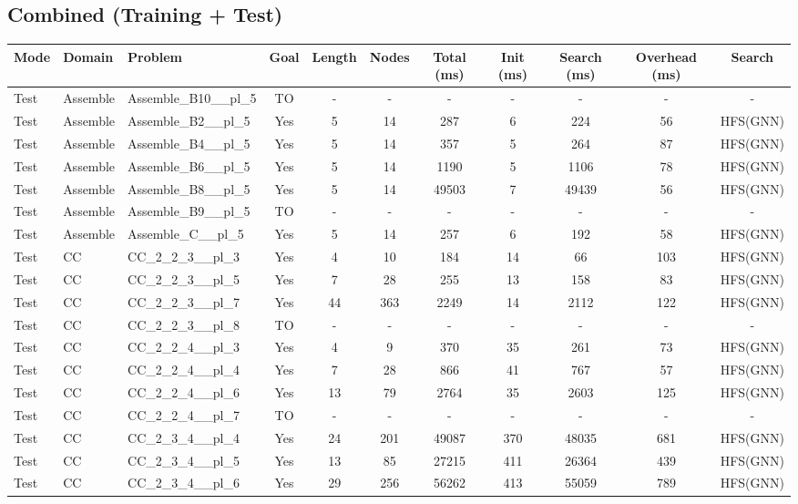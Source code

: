 \documentclass{article}
\begin{document}
\subsection*{Combined (Training + Test)}
\begin{tabular}{lllcccccccc}
\toprule
Mode & Domain & Problem & Goal & Length & Nodes & Total (ms) & Init (ms) & Search (ms) & Overhead (ms) & Search \\
\midrule
Test & Assemble & Assemble\_B10\_\_pl\_5 & TO & - & - & - & - & - & - & - \\
Test & Assemble & Assemble\_B2\_\_pl\_5 & Yes & 5 & 14 & 287 & 6 & 224 & 56 & HFS(GNN) \\
Test & Assemble & Assemble\_B4\_\_pl\_5 & Yes & 5 & 14 & 357 & 5 & 264 & 87 & HFS(GNN) \\
Test & Assemble & Assemble\_B6\_\_pl\_5 & Yes & 5 & 14 & 1190 & 5 & 1106 & 78 & HFS(GNN) \\
Test & Assemble & Assemble\_B8\_\_pl\_5 & Yes & 5 & 14 & 49503 & 7 & 49439 & 56 & HFS(GNN) \\
Test & Assemble & Assemble\_B9\_\_pl\_5 & TO & - & - & - & - & - & - & - \\
Test & Assemble & Assemble\_C\_\_pl\_5 & Yes & 5 & 14 & 257 & 6 & 192 & 58 & HFS(GNN) \\
Test & CC & CC\_2\_2\_3\_\_pl\_3 & Yes & 4 & 10 & 184 & 14 & 66 & 103 & HFS(GNN) \\
Test & CC & CC\_2\_2\_3\_\_pl\_5 & Yes & 7 & 28 & 255 & 13 & 158 & 83 & HFS(GNN) \\
Test & CC & CC\_2\_2\_3\_\_pl\_7 & Yes & 44 & 363 & 2249 & 14 & 2112 & 122 & HFS(GNN) \\
Test & CC & CC\_2\_2\_3\_\_pl\_8 & TO & - & - & - & - & - & - & - \\
Test & CC & CC\_2\_2\_4\_\_pl\_3 & Yes & 4 & 9 & 370 & 35 & 261 & 73 & HFS(GNN) \\
Test & CC & CC\_2\_2\_4\_\_pl\_4 & Yes & 7 & 28 & 866 & 41 & 767 & 57 & HFS(GNN) \\
Test & CC & CC\_2\_2\_4\_\_pl\_6 & Yes & 13 & 79 & 2764 & 35 & 2603 & 125 & HFS(GNN) \\
Test & CC & CC\_2\_2\_4\_\_pl\_7 & TO & - & - & - & - & - & - & - \\
Test & CC & CC\_2\_3\_4\_\_pl\_4 & Yes & 24 & 201 & 49087 & 370 & 48035 & 681 & HFS(GNN) \\
Test & CC & CC\_2\_3\_4\_\_pl\_5 & Yes & 13 & 85 & 27215 & 411 & 26364 & 439 & HFS(GNN) \\
Test & CC & CC\_2\_3\_4\_\_pl\_6 & Yes & 29 & 256 & 56262 & 413 & 55059 & 789 & HFS(GNN) \\

\end{tabular}
\end{document}
